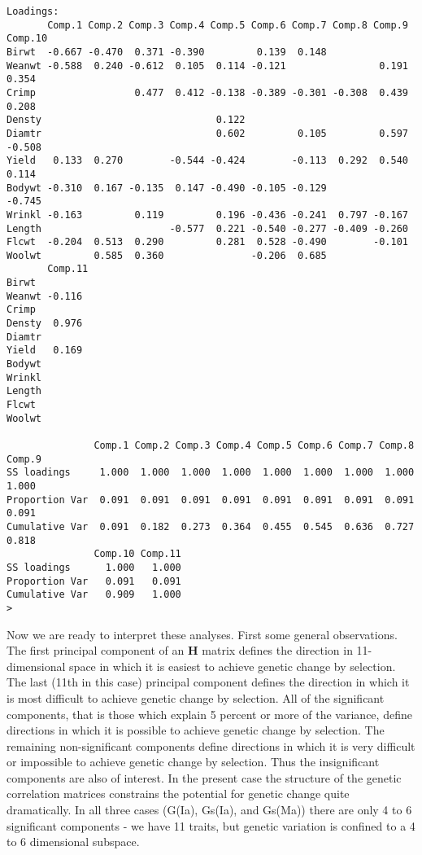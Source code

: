 \documentclass[titlepage]{article}  %
\begin{document}
\begin{verbatim}
Loadings:
       Comp.1 Comp.2 Comp.3 Comp.4 Comp.5 Comp.6 Comp.7 Comp.8 Comp.9 Comp.10
Birwt  -0.667 -0.470  0.371 -0.390         0.139  0.148                      
Weanwt -0.588  0.240 -0.612  0.105  0.114 -0.121                0.191  0.354 
Crimp                 0.477  0.412 -0.138 -0.389 -0.301 -0.308  0.439  0.208 
Densty                              0.122                                    
Diamtr                              0.602         0.105         0.597 -0.508 
Yield   0.133  0.270        -0.544 -0.424        -0.113  0.292  0.540  0.114 
Bodywt -0.310  0.167 -0.135  0.147 -0.490 -0.105 -0.129               -0.745 
Wrinkl -0.163         0.119         0.196 -0.436 -0.241  0.797 -0.167        
Length                      -0.577  0.221 -0.540 -0.277 -0.409 -0.260        
Flcwt  -0.204  0.513  0.290         0.281  0.528 -0.490        -0.101        
Woolwt         0.585  0.360               -0.206  0.685                      
       Comp.11
Birwt         
Weanwt -0.116 
Crimp         
Densty  0.976 
Diamtr        
Yield   0.169 
Bodywt        
Wrinkl        
Length        
Flcwt         
Woolwt        

               Comp.1 Comp.2 Comp.3 Comp.4 Comp.5 Comp.6 Comp.7 Comp.8 Comp.9
SS loadings     1.000  1.000  1.000  1.000  1.000  1.000  1.000  1.000  1.000
Proportion Var  0.091  0.091  0.091  0.091  0.091  0.091  0.091  0.091  0.091
Cumulative Var  0.091  0.182  0.273  0.364  0.455  0.545  0.636  0.727  0.818
               Comp.10 Comp.11
SS loadings      1.000   1.000
Proportion Var   0.091   0.091
Cumulative Var   0.909   1.000
> 

\end{verbatim}

Now we are ready to interpret these  analyses. First some general observations. The first principal component of an $\bm{H}$ matrix defines the direction in 11-dimensional space in which it is easiest to achieve genetic change by selection. The last (11th in this case) principal component defines the direction in which it is most difficult to achieve genetic change by selection. All of the significant components, that is those which explain 5 percent or more of the variance, define directions in which it is possible to achieve genetic change by selection. The remaining non-significant components define directions in which it is very difficult or impossible to achieve genetic change by selection. Thus the insignificant components are also of interest. In the present case the structure of the genetic correlation matrices constrains the potential for genetic change quite dramatically. In all three cases (G(Ia), Gs(Ia), and Gs(Ma)) there are only 4 to 6 significant components - we have 11 traits, but genetic variation is confined to a 4 to 6 dimensional subspace.
\end{document}
